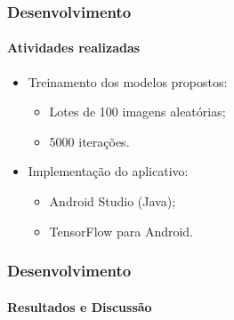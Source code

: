 \documentclass{beamer}
\begin{document}
    \begin{frame}
      \frametitle{Desenvolvimento}
      \framesubtitle{Atividades realizadas}      
      \begin{itemize}
        \item<1-> Treinamento dos modelos propostos:
		 \begin{itemize}
        		\item<2-> Lotes de 100 imagens aleatórias;
        		\item<3-> 5000 iterações. \bigskip
		\end{itemize}        
        \item<4-> Implementação do aplicativo:
        \begin{itemize} 
        		\item<5-> Android Studio (Java);
        		\item<5-> TensorFlow para Android. \bigskip
        		   
		\end{itemize}
      \end{itemize}
    \end{frame}
        
    
    \begin{frame}
      \frametitle{Desenvolvimento}
      \framesubtitle{Resultados e Discussão}
      
    
    
    
    \end{frame}
    
\end{document}
